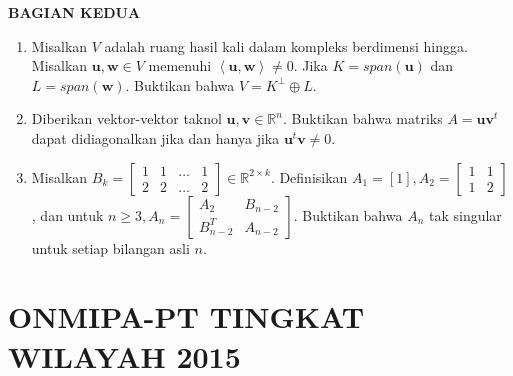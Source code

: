 \documentclass[12pt,twoside]{article}
\begin{document}
\newpage \textbf{BAGIAN KEDUA}
\begin{enumerate}
	\item Misalkan $V$ adalah ruang hasil kali dalam kompleks berdimensi hingga. Misalkan $\textbf{u}, \textbf{w} \in V$ memenuhi $\left<\textbf{u}, \textbf{w}\right> \neq 0. $ Jika $K = span (\textbf{u})$ dan $L = span (\textbf{w})$. Buktikan bahwa $V = K^{\perp}\oplus L$.

	\item Diberikan vektor-vektor taknol $\mathbf{u,v} \in \mathbb{R}^n.$ Buktikan bahwa matriks $A = \mathbf{uv}^t$ dapat didiagonalkan jika dan hanya jika $\mathbf{u}^t\mathbf{v}\neq0$.

	\item Misalkan $B_k = \left[ \begin{array}{cccc}
				      1 & 1 & \dots & 1 \\2&2&\dots&2
			      \end{array} \right] \in \mathbb{R}^{2 \times k}$. Definisikan $A_1 = [1], A_2 = \left[ \begin{array}{cc}
				      1 & 1 \\1&2
			      \end{array} \right]$, dan untuk $n \geq 3, A_n = \left[ \begin{array}{cc}
				      A_2 & B_{n-2} \\B^T_{n-2}&A_{n-2}
			      \end{array} \right] $. Buktikan bahwa $A_n$ tak singular untuk setiap bilangan asli $n$.

\end{enumerate}

\newpage

\section{ONMIPA-PT TINGKAT WILAYAH 2015}
\end{document}
